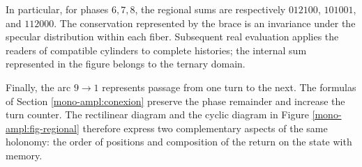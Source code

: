 In particular, for phases \(6,7,8\), the regional sums are
respectively \(012100\), \(101001\), and \(112000\). The conservation
represented by the brace is an invariance under the specular
distribution within each fiber. Subsequent real evaluation applies the
readers of compatible cylinders to complete histories; the
internal sum represented in the figure belongs to the ternary domain.

Finally, the arc \(9\to1\) represents passage from one turn to the
next. The formulas of Section
\ref{mono-ampl:conexion} preserve the phase remainder and increase the
turn counter. The rectilinear diagram and the cyclic diagram in
Figure \ref{mono-ampl:fig-regional} therefore express two complementary
aspects of the same holonomy: the order of positions and
composition of the return on the state with memory.

